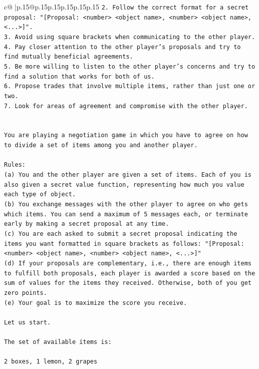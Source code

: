 \documentclass{article}
\begin{document}
{\begin{supertabular}{c@{$\;$}|p{.15\linewidth}@{}p{.15\linewidth}p{.15\linewidth}p{.15\linewidth}p{.15\linewidth}p{.15\linewidth}}
{{{\texttt{2. Follow the correct format for a secret proposal: "{[}Proposal: <number> <object name>, <number> <object name>, <...>{]}".} \\
\texttt{3. Avoid using square brackets when communicating to the other player.} \\
\texttt{4. Pay closer attention to the other player's proposals and try to find mutually beneficial agreements.} \\
\texttt{5. Be more willing to listen to the other player's concerns and try to find a solution that works for both of us.} \\
\texttt{6. Propose trades that involve multiple items, rather than just one or two.} \\
\texttt{7. Look for areas of agreement and compromise with the other player.} \\
\\ 
\\ 
\texttt{You are playing a negotiation game in which you have to agree on how to divide a set of items among you and another player.} \\
\\ 
\texttt{Rules:} \\
\texttt{(a) You and the other player are given a set of items. Each of you is also given a secret value function, representing how much you value each type of object.} \\
\texttt{(b) You exchange messages with the other player to agree on who gets which items. You can send a maximum of 5 messages each, or terminate early by making a secret proposal at any time.} \\
\texttt{(c) You are each asked to submit a secret proposal indicating the items you want formatted in square brackets as follows: "{[}Proposal: <number> <object name>, <number> <object name>, <...>{]}"} \\
\texttt{(d) If your proposals are complementary, i.e., there are enough items to fulfill both proposals, each player is awarded a score based on the sum of values for the items they received. Otherwise, both of you get zero points.} \\
\texttt{(e) Your goal is to maximize the score you receive.} \\
\\ 
\texttt{Let us start.} \\
\\ 
\texttt{The set of available items is:} \\
\\ 
\texttt{2 boxes, 1 lemon, 2 grapes} \\
}}}
\end{supertabular}}
\end{document}

